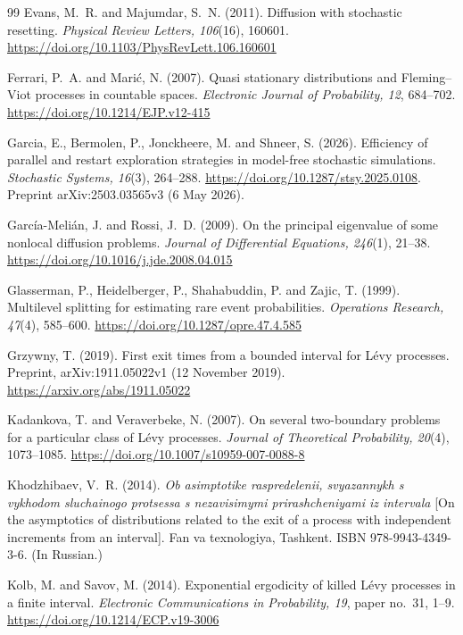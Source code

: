 \documentclass[11pt,a4paper]{article}
\theoremstyle{definition}
\theoremstyle{remark}
\newcommand{\1}{\mathbf 1}
\begin{document}
\begin{thebibliography}{99}
Evans, M.~R. and Majumdar, S.~N. (2011). Diffusion with stochastic resetting. \emph{Physical Review Letters, 106}(16), 160601. \url{https://doi.org/10.1103/PhysRevLett.106.160601}

Ferrari, P.~A. and Mari\'c, N. (2007). Quasi stationary distributions and Fleming--Viot processes in countable spaces. \emph{Electronic Journal of Probability, 12}, 684--702. \url{https://doi.org/10.1214/EJP.v12-415}

Garcia, E., Bermolen, P., Jonckheere, M. and Shneer, S. (2026). Efficiency of parallel and restart exploration strategies in model-free stochastic simulations. \emph{Stochastic Systems, 16}(3), 264--288. \url{https://doi.org/10.1287/stsy.2025.0108}. Preprint arXiv:2503.03565v3 (6 May 2026).

Garc\'ia-Meli\'an, J. and Rossi, J.~D. (2009). On the principal eigenvalue of some nonlocal diffusion problems. \emph{Journal of Differential Equations, 246}(1), 21--38. \url{https://doi.org/10.1016/j.jde.2008.04.015}

Glasserman, P., Heidelberger, P., Shahabuddin, P. and Zajic, T. (1999). Multilevel splitting for estimating rare event probabilities. \emph{Operations Research, 47}(4), 585--600. \url{https://doi.org/10.1287/opre.47.4.585}

Grzywny, T. (2019). First exit times from a bounded interval for L\'evy processes. Preprint, arXiv:1911.05022v1 (12 November 2019). \url{https://arxiv.org/abs/1911.05022}

Kadankova, T. and Veraverbeke, N. (2007). On several two-boundary problems for a particular class of L\'evy processes. \emph{Journal of Theoretical Probability, 20}(4), 1073--1085. \url{https://doi.org/10.1007/s10959-007-0088-8}

Khodzhibaev, V.~R. (2014). \emph{Ob asimptotike raspredelenii, svyazannykh s vykhodom sluchainogo protsessa s nezavisimymi prirashcheniyami iz intervala} [On the asymptotics of distributions related to the exit of a process with independent increments from an interval]. Fan va texnologiya, Tashkent. ISBN 978-9943-4349-3-6. (In Russian.)

Kolb, M. and Savov, M. (2014). Exponential ergodicity of killed L\'evy processes in a finite interval. \emph{Electronic Communications in Probability, 19}, paper no.~31, 1--9. \url{https://doi.org/10.1214/ECP.v19-3006}


\end{thebibliography}
\end{document}
